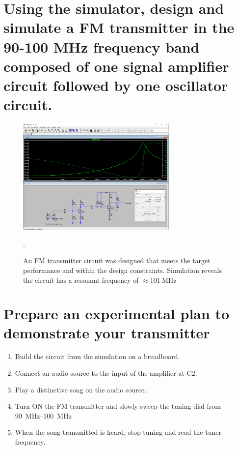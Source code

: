 \documentclass{article}
\begin{document}
	\section{Using the simulator, design and simulate a FM transmitter in the 90-100 MHz frequency band
composed of one signal amplifier circuit followed by one oscillator circuit.}

	\begin{figure}[H]
	    \centering
	    \includegraphics[width=0.7\textwidth]{s1}
	    \caption{An FM transmitter circuit was designed that meets the target performance and within the design constraints. Simulation reveals the circuit has a resonant frequency of $\approx\SI{101}{\MHz}$}.
	\end{figure}

	
	\section{Prepare an experimental plan to demonstrate your transmitter}
	
	\begin{enumerate}
		\item Build the circuit from the simulation on a breadboard.
		\item Connect an audio source to the input of the amplifier at C2.
		\item Play a distinctive song on the audio source.
		\item Turn ON the FM transmitter and slowly sweep the tuning dial from \SIrange{90}{100}{\MHz}
		\item When the song transmitted is heard, stop tuning and read the tuner frequency.
	\end{enumerate}
	
\end{document}
